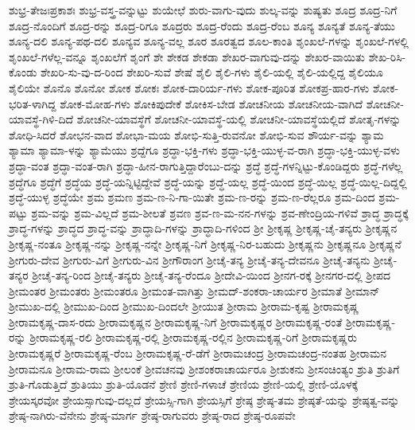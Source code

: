 {ಶುಭ್ರ-ತೇಜಃಪ್ರಕಾಶಃ
ಶುಭ್ರ-ವಸ್ತ್ರ-ವನ್ನುಟ್ಟು
ಶುಯೇಛೆ
ಶುರು-ವಾಗು-ವುದು
ಶುಲ್ಕ-ವನ್ನು
ಶುಷ್ಯತು
ಶೂದ್ರ
ಶೂದ್ರ-ನಿಗೆ
ಶೂದ್ರ-ನೊಂದಿಗೆ
ಶೂದ್ರ-ರನ್ನು
ಶೂದ್ರ-ರಿಗೂ
ಶೂದ್ರರು
ಶೂದ್ರ-ರೆಂದು
ಶೂದ್ರ-ರೆಂಬ
ಶೂನ್ಯ
ಶೂನ್ಯತೆ
ಶೂನ್ಯ-ತೆಯು
ಶೂನ್ಯ-ದಲಿ
ಶೂನ್ಯ-ಪಥ-ದಲಿ
ಶೂನ್ಯವ
ಶೂನ್ಯ-ವಲ್ಲ
ಶೂರ
ಶೂರತ್ವದ
ಶೂಲ-ಕಾಂತಿ
ಶೃಂಖಲೆ-ಗಳನ್ನು
ಶೃಂಖಲೆ-ಗಳಲ್ಲಿ
ಶೃಂಖಲೆ-ಗಳೆಲ್ಲ-ವನ್ನೂ
ಶೃಂಖಲೆಗೆ
ಶೃಂಗೆ
ಶೇ
ಶೇಕಡ
ಶೇಕಡಾ
ಶೇಖರ-ವಾಗುವು-ದನ್ನು
ಶೇಖರ-ವಾಯಿತು
ಶೇಖ-ರಿಸಿ-ಕೊಂಡು
ಶೇಖರಿ-ಸು-ವು-ದ-ರಿಂದ
ಶೇಖರಿ-ಸುವೆ
ಶೇಷೆ
ಶೈಲಿ
ಶೈಲಿ-ಗಳು
ಶೈಲಿ-ಯಲ್ಲಿ
ಶೈಲಿ-ಯಲ್ಲಿದ್ದ
ಶೈಲಿಯೂ
ಶೈಲಿಯೇ
ಶೊನೊ
ಶೊನೋ
ಶೋಕ
ಶೋಕಃ
ಶೋಕ-ದಾರಿರ್ಯ-ಗಳು
ಶೋಕ-ಪೂರಿತ
ಶೋಕಪ್ರ-ಹಾರ-ಗಳು
ಶೋಕ-ಭರಿತ-ಳಾಗಿದ್ದ
ಶೋಕ-ಮೋಹ-ಗಳು
ಶೋಕಿಪುದೇಕೆ
ಶೋಕಿಸ-ಬೇಡ
ಶೋಚನೀಯ
ಶೋಚನೀಯ-ವಾಗಿದೆ
ಶೋಚನೀ-ಯಾವಸ್ಥೆ-ಗಿಳಿ-ದಿದೆ
ಶೋಚನೀ-ಯಾವಸ್ಥೆಗೆ
ಶೋಚನೀ-ಯಾವಸ್ಥೆ-ಯಲ್ಲಿ
ಶೋಚನೀ-ಯಾವಸ್ಥೆಯಲ್ಲಿದೆ
ಶೋತೃ-ಗಳನ್ನು
ಶೋಧಿ-ಸಿದರೆ
ಶೋಭನ-ವಾದ
ಶೋಭಾ-ಮಯ
ಶೋಭಿ-ಸುತ್ತಿ-ರುವನೋ
ಶೋಭಿ-ಸುವ
ಶೌರ್ಯ-ವನ್ನು
ಶ್ಯಾಮ
ಶ್ಯಾಮಾ
ಶ್ಯಾಮಾ-ಳನ್ನು
ಶ್ಯಾಮೆಯು
ಶ್ರದ್ದೆಗೂ
ಶ್ರದ್ಧಾ-ಭಕ್ತಿ-ಗಳು
ಶ್ರದ್ಧಾ-ಭಕ್ತಿ-ಯುಳ್ಳ-ವ-ರಾಗಿ
ಶ್ರದ್ಧಾ-ಭಕ್ತಿ-ಯುಳ್ಳ-ವಳು
ಶ್ರದ್ಧಾ-ವಂತ
ಶ್ರದ್ಧಾ-ವಂತ-ರಾಗಿ
ಶ್ರದ್ಧಾ-ಹೀನ-ರಾಗುತ್ತಿದ್ದಾರೆಂಬು-ದನ್ನು
ಶ್ರದ್ಧೆ
ಶ್ರದ್ಧೆ-ಗಳನ್ನಿಟ್ಟು-ಕೊಂಡಿದ್ದರು
ಶ್ರದ್ಧೆ-ಗಳೆಲ್ಲ
ಶ್ರದ್ಧೆಗೂ
ಶ್ರದ್ಧೆಗೆ
ಶ್ರದ್ಧೆಯ
ಶ್ರದ್ಧೆ-ಯನ್ನಿಟ್ಟಿದ್ದೇವೆ
ಶ್ರದ್ಧೆ-ಯನ್ನು
ಶ್ರದ್ಧೆ-ಯಲ್ಲ
ಶ್ರದ್ಧೆ-ಯಿಂದ
ಶ್ರದ್ಧೆ-ಯಿಲ್ಲ
ಶ್ರದ್ಧೆ-ಯಿಲ್ಲ-ದಿದ್ದಲ್ಲಿ
ಶ್ರದ್ಧೆ-ಯುಳ್ಳ
ಶ್ರದ್ಧೆಯೇ
ಶ್ರಮ
ಶ್ರಮಣ
ಶ್ರಮ-ಣ-ನಿ-ಗಾ-ಯಿತೇ
ಶ್ರಮ-ಣ-ರನ್ನು
ಶ್ರಮ-ಣ-ರೆಲ್ಲರೂ
ಶ್ರಮ-ದಿಂದ
ಶ್ರಮ-ಪಟ್ಟು
ಶ್ರಮ-ವನ್ನು
ಶ್ರಮ-ವಿಲ್ಲದೆ
ಶ್ರಮ-ಶೀಲತೆ
ಶ್ರವಣ
ಶ್ರವ-ಣ-ಮ-ನನ-ಗಳನ್ನು
ಶ್ರವ-ಣೇಂದ್ರಿಯ-ಗಳಿವೆ
ಶ್ರಾದ್ಧ
ಶ್ರಾದ್ಧಕ್ಕೆ
ಶ್ರಾದ್ಧ-ಗಳನ್ನು
ಶ್ರಾದ್ಧದ
ಶ್ರಾದ್ಧ-ವನ್ನು
ಶ್ರಾದ್ಧಾದಿ-ಗಳನ್ನು
ಶ್ರಾದ್ಧಾದಿ-ಗಳಿಂದ
ಶ್ರೀ
ಶ್ರೀಕೃಷ್ಣ
ಶ್ರೀಕೃಷ್ಣ-ಚೈ-ತನ್ಯರು
ಶ್ರೀಕೃಷ್ಣನ
ಶ್ರೀಕೃಷ್ಣ-ನಂತೂ
ಶ್ರೀಕೃಷ್ಣ-ನನ್ನು
ಶ್ರೀಕೃಷ್ಣ-ನನ್ನೇ
ಶ್ರೀಕೃಷ್ಣ-ನಿಗೆ
ಶ್ರೀಕೃಷ್ಣ-ನಿರ-ಬಹುದು
ಶ್ರೀಕೃಷ್ಣನು
ಶ್ರೀಕೃಷ್ಣನೂ
ಶ್ರೀಕೃಷ್ಣನೆ
ಶ್ರೀಗುರು-ದೇವ
ಶ್ರೀಗುರು-ವಿಗೆ
ಶ್ರೀಗುರು-ವಿನ
ಶ್ರೀಗೌರಾಂಗ
ಶ್ರೀಚೈ-ತನ್ಯ
ಶ್ರೀಚೈ-ತನ್ಯ-ದೇವನೂ
ಶ್ರೀಚೈ-ತನ್ಯನು
ಶ್ರೀಚೈ-ತನ್ಯರ
ಶ್ರೀಚೈ-ತನ್ಯ-ರಿಂದ
ಶ್ರೀಚೈ-ತನ್ಯರು
ಶ್ರೀಚೈ-ತನ್ಯ-ರೆಂದೂ
ಶ್ರೀದೇವಿ-ಯಿಂದ
ಶ್ರೀನಗ-ರಕ್ಕೆ
ಶ್ರೀನಗರ-ದಲ್ಲಿ
ಶ್ರೀಪದ
ಶ್ರೀಮಂತರ
ಶ್ರೀಮಂತರು
ಶ್ರೀಮಂತರೂ
ಶ್ರೀಮಂತ-ವಾಗಿತ್ತು
ಶ್ರೀಮದ್-ಶಂಕರಾ-ಚಾರ್ಯರ
ಶ್ರೀಮಾತೆ
ಶ್ರೀಮಾನ್
ಶ್ರೀಮುಖ-ದಲ್ಲಿ
ಶ್ರೀಮುಖ-ದಿಂದ
ಶ್ರೀಮುಖ-ದಿಂದಲೇ
ಶ್ರೀಯುತ
ಶ್ರೀರಾಮ
ಶ್ರೀರಾಮ-ಕೃಷ್ಟ
ಶ್ರೀರಾಮಕೃಷ್ಣ
ಶ್ರೀರಾಮಕೃಷ್ಣ-ದಾಸ-ರದು
ಶ್ರೀರಾಮಕೃಷ್ಣನ
ಶ್ರೀರಾಮಕೃಷ್ಣ-ನಿಗೆ
ಶ್ರೀರಾಮಕೃಷ್ಣರ
ಶ್ರೀರಾಮಕೃಷ್ಣ-ರಂತೆ
ಶ್ರೀರಾಮಕೃಷ್ಣ-ರನ್ನು
ಶ್ರೀರಾಮಕೃಷ್ಣ-ರಲಿ
ಶ್ರೀರಾಮಕೃಷ್ಣ-ರಲ್ಲಿ
ಶ್ರೀರಾಮಕೃಷ್ಣ-ರಲ್ಲಿನ
ಶ್ರೀರಾಮಕೃಷ್ಣ-ರಿಗೆ
ಶ್ರೀರಾಮಕೃಷ್ಣರು
ಶ್ರೀರಾಮಕೃಷ್ಣರೆ
ಶ್ರೀರಾಮಕೃಷ್ಣ-ರೆಂಬ
ಶ್ರೀರಾಮಕೃಷ್ಣ-ರೆ-ಡೆಗೆ
ಶ್ರೀರಾಮಚಂದ್ರ
ಶ್ರೀರಾಮಚಂದ್ರ-ನಂತಹ
ಶ್ರೀರಾಮನ
ಶ್ರೀರಾಮನೂ
ಶ್ರೀರಾಮ-ರಾಮ
ಶ್ರೀಲಂಕೆ
ಶ್ರೀವಚನವು
ಶ್ರೀಶಂಕರಾಚಾರ್ಯರೂ
ಶ್ರೀಶುಕನು
ಶ್ರೀಸಂಚಿಂತ್ಯಂ
ಶ್ರುತಿ
ಶ್ರುತಿಗೆ
ಶ್ರುತಿ-ಗೊಡುತ್ತಿದೆ
ಶ್ರುತಿಯು
ಶ್ರುತಿ-ಯೊಡನೆ
ಶ್ರೇಣಿ
ಶ್ರೇಣಿ-ಗಳಾಚೆ
ಶ್ರೇಣಿಯ
ಶ್ರೇಣಿ-ಯಲ್ಲಿ
ಶ್ರೇಣಿ-ಯೊಳಕ್ಕೆ
ಶ್ರೇಯಸ್ಕರವೋ
ಶ್ರೇಯಸ್ಸಾಗುವು-ದಲ್ಲದೆ
ಶ್ರೇಯಸ್ಸಿ-ಗಾಗಿ
ಶ್ರೇಯಸ್ಸಿಗೆ
ಶ್ರೇಷ್ಠ
ಶ್ರೇಷ್ಠ-ತಮ
ಶ್ರೇಷ್ಠತೆ-ಯನ್ನು
ಶ್ರೇಷ್ಠತ್ವ-ವನ್ನು
ಶ್ರೇಷ್ಠ-ನಾಗಿರು-ವೆನೇನು
ಶ್ರೇಷ್ಠ-ಮಾರ್ಗ
ಶ್ರೇಷ್ಠ-ರಾಗುವರು
ಶ್ರೇಷ್ಠ-ರಾದ
ಶ್ರೇಷ್ಠ-ರೂಪವೇ
}
